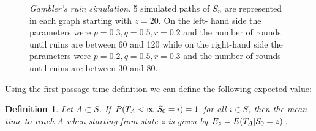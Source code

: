 \documentclass[11pt,twoside]{article}
\newtheorem{Definition}{Definition}
\numberwithin{Theorem}{section}
\numberwithin{Definition}{section}
\numberwithin{Lemma}{section}
\numberwithin{Algorithm}{section}
\numberwithin{equation}{section}
\begin{document}
\begin{figure}[h!]
  \centering
  \caption[Gambler's ruin simulation]{\textit{Gambler's ruin simulation}. 5 simulated paths of $S_{n}$ are represented in each graph starting with $z = 20$. On the left- hand side the parameters were $p = 0.3, q= 0.5, r=0.2$ and the number of rounds until ruins are between 60 and 120 while on the right-hand side the parameters were $p = 0.2, q= 0.5, r=0.3$ and the number of rounds until ruins are between 30 and 80.}  
  \label{fig:random_walk}
\end{figure}

Using the first passage time definition we can define the following expected value:

\begin{Definition}
    Let $A\subset S$. If $P(T_{A} <\infty  \text{\textbar} S_{0}= i) = 1$ for all $i \in S$, then the mean time to reach $A$ when starting from state $z$ is given by $E_{z} = E(T_{A} \text{\textbar} S_{0}= z)$. 
\end{Definition}
\end{document}
